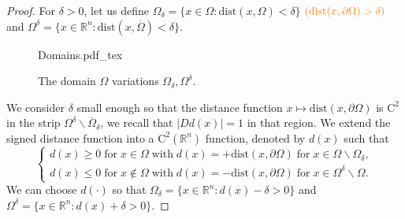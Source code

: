 \documentclass[11pt,reqno]{amsart}
\numberwithin{figure}{section}
\theoremstyle{plain}
\theoremstyle{remark}
\numberwithin{equation}{section}
\newcommand{\incfig}[1]{%
    \def\svgwidth{\columnwidth}
    {#1.pdf_tex}
}
\begin{document}
\begin{proof} For $\delta>0$, let us define $\Omega_\delta = \{x\in \Omega: \mathrm{dist}(x,\Omega) < \delta\}$ $\textcolor{orange}{(\mathrm{dist}(x,\partial \Omega) > \delta)}$ and $\Omega^\delta = \{x\in \mathbb{R}^n: \mathrm{dist}(x,\overline{\Omega}) < \delta\}$. 
\begin{figure}[ht]
    \centering
    \def\svgwidth{0.47\columnwidth}
    {Domains.pdf_tex}
    \caption{The domain $\Omega$ variations $\Omega_\delta, \Omega^\delta$.}
    \label{fig:Domains}
\end{figure}
We consider $\delta$ small enough so that the distance function $x\mapsto \mathrm{dist}(x,\partial \Omega)$ is $\mathrm{C}^2$ in the strip $\Omega^\delta\backslash \overline{\Omega}_\delta$, we recall that $|D d(x)| = 1$ in that region. We extend the signed distance function into a $\mathrm{C}^2(\mathbb{R}^n)$ function, denoted by $d(x)$ such that 
\begin{equation*}
    \begin{cases}
    d(x)\geq 0\;\text{for}\;x\in\Omega\;\text{with}\;d(x) = +\mathrm{dist}(x,\partial\Omega)\;\text{for}\;x\in \Omega\backslash \Omega_\delta,\\
    d(x)\leq 0\;\text{for}\;x\notin \Omega\;\text{with}\;d(x) = -\mathrm{dist}(x,\partial\Omega)\;\text{for}\;x\in \Omega^\delta\backslash \Omega.
    \end{cases}
\end{equation*}
We can choose $d(\cdot)$ so that $\Omega_\delta = \{x\in \mathbb{R}^n: d(x)-\delta >0 \}$ and $\Omega^\delta = \{x\in \mathbb{R}^n: d(x) +\delta>0\}$.


\end{proof}
\end{document}
